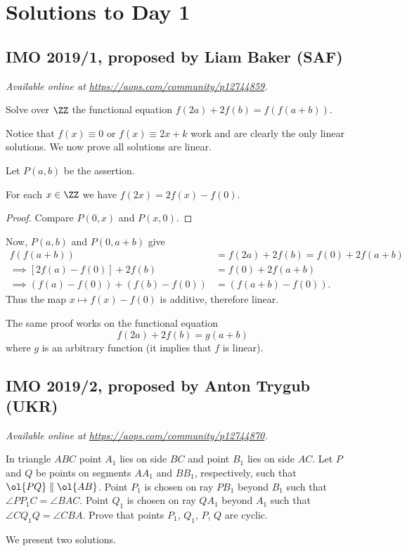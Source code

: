 \documentclass[11pt]{scrartcl}
\begin{document}
\section{Solutions to Day 1}
\subsection{IMO 2019/1, proposed by Liam Baker (SAF)}
\textsl{Available online at \url{https://aops.com/community/p12744859}.}
\begin{mdframed}[style=mdpurplebox,frametitle={Problem statement}]
Solve over $\ZZ$ the functional equation
$f(2a) + 2f(b) = f(f(a+b))$.
\end{mdframed}
Notice that $f(x) \equiv 0$ or $f(x) \equiv 2x+k$ work
and are clearly the only linear solutions.
We now prove all solutions are linear.

Let $P(a,b)$ be the assertion.
\begin{claim*}
  For each $x \in \ZZ$ we have $f(2x) = 2f(x) - f(0)$.
\end{claim*}
\begin{proof}
  Compare $P(0,x)$ and $P(x,0)$.
\end{proof}
Now, $P(a,b)$ and $P(0,a+b)$ give
\begin{align*}
  f(f(a+b)) &= f(2a) + 2f(b) = f(0) + 2f(a+b) \\
  \implies [2f(a) - f(0)] + 2f(b) &= f(0) + 2f(a+b) \\
  \implies \left( f(a)-f(0) \right) + \left( f(b)-f(0) \right)
  &= \left( f(a+b)-f(0) \right).
\end{align*}
Thus the map $x \mapsto f(x) - f(0)$ is additive,
therefore linear.

\begin{remark*}
  The same proof works on the functional equation
  \[ f(2a) + 2f(b) = g(a+b) \]
  where $g$ is an arbitrary function (it implies that $f$ is linear).
\end{remark*}
\pagebreak

\subsection{IMO 2019/2, proposed by Anton Trygub (UKR)}
\textsl{Available online at \url{https://aops.com/community/p12744870}.}
\begin{mdframed}[style=mdpurplebox,frametitle={Problem statement}]
In triangle $ABC$ point $A_1$ lies on side $BC$
and point $B_1$ lies on side $AC$.
Let $P$ and $Q$ be points on segments $AA_1$ and $BB_1$,
respectively, such that $\ol{PQ} \parallel \ol{AB}$.
Point $P_1$ is chosen on ray $PB_1$ beyond $B_1$
such that $\angle PP_1C = \angle BAC$.
Point $Q_1$ is chosen on ray $QA_1$ beyond $A_1$
such that $\angle CQ_1Q = \angle CBA$.
Prove that points $P_1$, $Q_1$, $P$, $Q$ are cyclic.
\end{mdframed}
We present two solutions.
\end{document}
